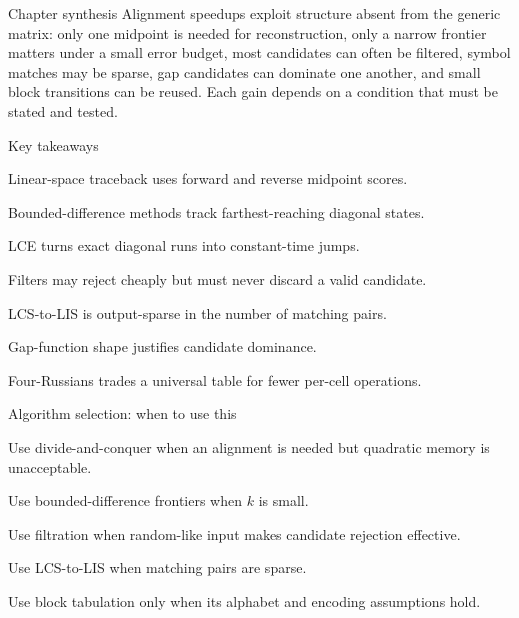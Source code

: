 \documentclass[11pt,letterpaper]{article}
\begin{document}
\begin{CornellSummaryBox}{Chapter synthesis}
Alignment speedups exploit structure absent from the generic matrix: only one midpoint is needed for reconstruction, only a narrow frontier matters under a small error budget, most candidates can often be filtered, symbol matches may be sparse, gap candidates can dominate one another, and small block transitions can be reused. Each gain depends on a condition that must be stated and tested.
\end{CornellSummaryBox}

\begin{CornellSummaryBox}{Key takeaways}
\begin{CornellRecallList}
  \item Linear-space traceback uses forward and reverse midpoint scores.
  \item Bounded-difference methods track farthest-reaching diagonal states.
  \item LCE turns exact diagonal runs into constant-time jumps.
  \item Filters may reject cheaply but must never discard a valid candidate.
  \item LCS-to-LIS is output-sparse in the number of matching pairs.
  \item Gap-function shape justifies candidate dominance.
  \item Four-Russians trades a universal table for fewer per-cell operations.
\end{CornellRecallList}
\end{CornellSummaryBox}

\begin{CornellOverviewBox}{Algorithm selection: when to use this}
\begin{CornellChecklist}
  \item Use divide-and-conquer when an alignment is needed but quadratic memory is unacceptable.
  \item Use bounded-difference frontiers when $k$ is small.
  \item Use filtration when random-like input makes candidate rejection effective.
  \item Use LCS-to-LIS when matching pairs are sparse.
  \item Use block tabulation only when its alphabet and encoding assumptions hold.
\end{CornellChecklist}
\end{CornellOverviewBox}
\end{document}
